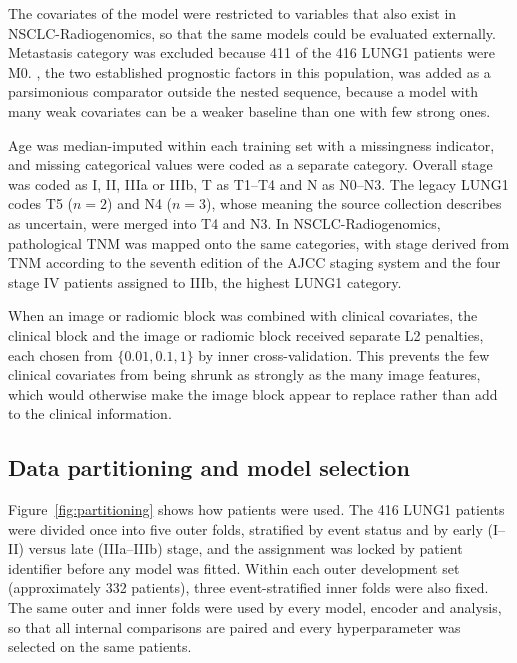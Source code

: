 \tabClinical

The covariates of the  model were restricted to variables that also exist in NSCLC-Radiogenomics, so that the same models could be evaluated externally. Metastasis category was excluded because 411 of the 416 LUNG1 patients were M0. , the two established prognostic factors in this population,\cite{goldstraw2016,bradley2002} was added as a parsimonious comparator outside the nested sequence, because a model with many weak covariates can be a weaker baseline than one with few strong ones.

Age was median-imputed within each training set with a missingness indicator, and missing categorical values were coded as a separate category. Overall stage was coded as I, II, IIIa or IIIb, T as T1--T4 and N as N0--N3. The legacy LUNG1 codes T5 ($n=2$) and N4 ($n=3$), whose meaning the source collection describes as uncertain, were merged into T4 and N3. In NSCLC-Radiogenomics, pathological TNM was mapped onto the same categories, with stage derived from TNM according to the seventh edition of the AJCC staging system and the four stage IV patients assigned to IIIb, the highest LUNG1 category.

When an image or radiomic block was combined with clinical covariates, the clinical block and the image or radiomic block received separate L2 penalties, each chosen from $\{0.01, 0.1, 1\}$ by inner cross-validation. This prevents the few clinical covariates from being shrunk as strongly as the many image features, which would otherwise make the image block appear to replace rather than add to the clinical information.

\subsection{Data partitioning and model selection}\label{sec:partitioning}
Figure~\ref{fig:partitioning} shows how patients were used. The 416 LUNG1 patients were divided once into five outer folds, stratified by event status and by early (I--II) versus late (IIIa--IIIb) stage, and the assignment was locked by patient identifier before any model was fitted. Within each outer development set (approximately 332 patients), three event-stratified inner folds were also fixed. The same outer and inner folds were used by every model, encoder and analysis, so that all internal comparisons are paired and every hyperparameter was selected on the same patients.



